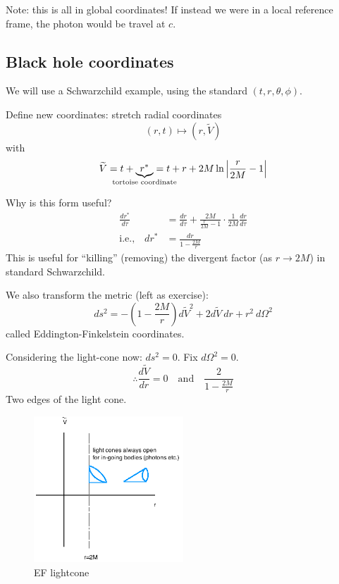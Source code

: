 \documentclass[a4paper]{article} %
\renewcommand{\tilde}{\widetilde}
\begin{document}
Note: this is all in global coordinates! If instead we were in a local reference frame, the photon would be travel at $c$.

\subsection{Black hole coordinates}
We will use a Schwarzchild example, using the standard $(t,r,\theta,\phi)$.

Define new coordinates: stretch radial coordinates
\begin{equation}
(r,t)\mapsto (r,\tilde{V})
\end{equation}
with
\begin{equation}
\tilde{V}=t+\underbrace{r^{\ast}}_{\mathclap{\text{tortoise coordinate}}}=t+r+2M\ln\left|\frac{r}{2M}-1\right|
\end{equation}

Why is this form useful?
\begin{align}
\frac{dr^{\ast}}{d\tau}&=\frac{dr}{d\tau}+\frac{2M}{\frac{r}{2M}-1}
\cdot\frac{1}{2M}\frac{dr}{d\tau}\\
\text{i.e.,}\quad dr^{\ast}&=\frac{dr}{1-\frac{2M}{r}}
\end{align}
This is useful for ``killing'' (removing) the divergent factor (as $r\to 2M$) in standard Schwarzchild.

We also transform the metric (left as exercise):
\begin{equation}
ds^2 = -\left(1-\frac{2M}{r}\right) d\tilde{V}^2 + 2d\tilde{V}~dr+r^2~d\Omega^2
\end{equation}
called Eddington-Finkelstein coordinates.

Considering the light-cone now: $ds^2=0$. Fix $d\Omega^2=0$.
\begin{equation}
\therefore \frac{d\tilde{V}}{dr}=0\quad\text{and}\quad \frac{2}{1-\frac{2M}{r}}
\end{equation}
Two edges of the light cone.

\begin{figure}[h]
\centering
\includegraphics[width=0.5\textwidth]{images/ef-lightcone.png}
\caption{EF lightcone}
\end{figure}
\end{document}
